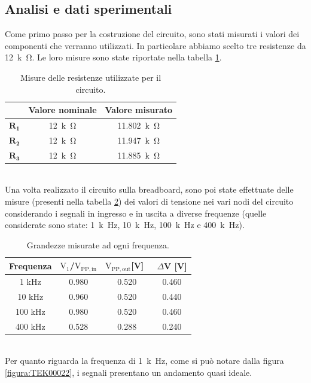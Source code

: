 \documentclass{report}
\begin{document}
\subsection{Analisi e dati sperimentali}
Come primo passo per la costruzione del circuito, sono stati misurati i valori dei componenti che verranno utilizzati. In particolare abbiamo scelto tre resistenze da \SI{12}{k\ohm}. Le loro misure sono state riportate nella tabella \ref{table:mis_res3}.
\begin{table}[h]
	\centering
	\begin{tabular}{|c|c|c|}
		\cline{2-3} 
		\multicolumn{1}{c|}{} & \textbf{Valore nominale} & \textbf{Valore misurato}\\ 
		\hline
		$\mathbf{R_1}$ & \SI{12}{k\ohm} & \SI{11.802}{k\ohm} \\ 
		\hline
		$\mathbf{R_2}$ & \SI{12}{k\ohm} & \SI{11.947}{k\ohm} \\ 
		\hline
		$\mathbf{R_3}$ & \SI{12}{k\ohm} & \SI{11.885}{k\ohm} \\ 
		\hline
	\end{tabular}
	\caption{Misure delle resistenze utilizzate per il circuito.}
	\label{table:mis_res3}
\end{table}
\\Una volta realizzato il circuito sulla breadboard, sono poi state effettuate delle misure (presenti nella tabella \ref{table:misure3}) dei valori di tensione nei vari nodi del circuito considerando i segnali in ingresso e in uscita a diverse frequenze (quelle considerate sono state: \SI{1}{k\hertz}, \SI{10}{k\hertz}, \SI{100}{k\hertz} e \SI{400}{k\hertz}).
\begin{table}[h!]
	\centering
	\begin{tabular}{|c|c|c|c|}
		\hline
		\textbf{Frequenza} & \boldmath$\displaystyle\mathrm{{V_{1}}}$\textbf{/}\boldmath$\displaystyle\mathrm{{V_{PP,in}}}$ & \boldmath$\displaystyle\mathrm{{V_{PP,out}}}$\textbf{[V]}\ & \boldmath$\Delta$\textbf{V [V]}\\
		\hline
		1 kHz & 0.980 & 0.520 & 0.460\\
		\hline
		10 kHz & 0.960 & 0.520 & 0.440\\
		\hline
		100 kHz & 0.980 & 0.520 & 0.460\\
		\hline
		400 kHz & 0.528 & 0.288 & 0.240\\
		\hline\end{tabular}
	\caption{Grandezze misurate ad ogni frequenza.}
	\label{table:misure3}
\end{table}
\\Per quanto riguarda la frequenza di \SI{1}{k\hertz}, come si può notare dalla figura \ref{figura:TEK00022}, i segnali presentano un andamento quasi ideale.
\end{document}
